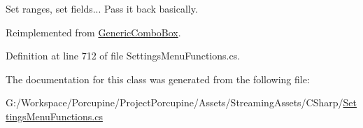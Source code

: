 Set ranges, set fields... Pass it back basically. 



Reimplemented from \hyperlink{class_generic_combo_box_ae1800a7c68d3af046a2b147e117437ff}{Generic\+Combo\+Box}.



Definition at line 712 of file Settings\+Menu\+Functions.\+cs.



The documentation for this class was generated from the following file\+:\begin{DoxyCompactItemize}
\item 
G\+:/\+Workspace/\+Porcupine/\+Project\+Porcupine/\+Assets/\+Streaming\+Assets/\+C\+Sharp/\hyperlink{_settings_menu_functions_8cs}{Settings\+Menu\+Functions.\+cs}\end{DoxyCompactItemize}
